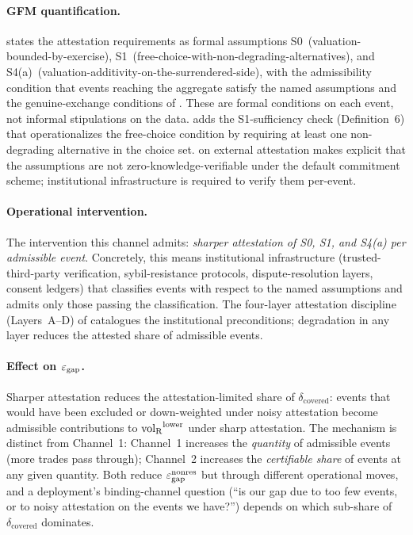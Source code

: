 \paragraph{GFM quantification.}
\citep[Revealed~Sacrifice]{lasser2026paper8a} states the
attestation requirements as formal assumptions
S0~(valuation-bounded-by-exercise),
S1~(free-choice-with-non-degrading-alternatives), and
S4(a)~(valuation-additivity-on-the-surrendered-side), with the
admissibility condition that events reaching the aggregate satisfy
the named assumptions and the genuine-exchange conditions of
\citep[Definition~2]{lasser2026paper8a}.  These are formal
conditions on each event, not informal stipulations on the data.
\citep[Need~Sufficiency]{lasser2026paper8b} adds the
S1-sufficiency check (Definition~6) that operationalizes the
free-choice condition by requiring at least one non-degrading
alternative in the choice set.  \citep[Remark~18]{lasser2026paper8a}
on external attestation makes explicit that the assumptions are
not zero-knowledge-verifiable under the default commitment
scheme; institutional infrastructure is required to verify them
per-event.

\paragraph{Operational intervention.}
The intervention this channel admits: \emph{sharper attestation of
S0, S1, and S4(a) per admissible event}.  Concretely, this means
institutional infrastructure (trusted-third-party verification,
sybil-resistance protocols, dispute-resolution layers, consent
ledgers) that classifies events with respect to the named
assumptions and admits only those passing the classification.
The four-layer attestation discipline (Layers~A--D) of
\citep[Remark~18]{lasser2026paper8a} catalogues the institutional
preconditions; degradation in any layer reduces the attested
share of admissible events.

\paragraph{Effect on $\varepsilon_{\mathrm{gap}}$.}
Sharper attestation reduces the attestation-limited share of
$\delta_{\mathrm{covered}}$: events that would have been excluded
or down-weighted under noisy attestation become admissible
contributions to ${\operatorname{vol}_{\mathrm{R}}}^{\mathrm{lower}}$ under sharp attestation.  The
mechanism is distinct from Channel~1: Channel~1 increases the
\emph{quantity} of admissible events (more trades pass through);
Channel~2 increases the \emph{certifiable share} of events at any
given quantity.  Both reduce $\varepsilon_{\mathrm{gap}}^{\mathrm{nonres}}$ but through different
operational moves, and a deployment's binding-channel question
(``is our gap due to too few events, or to noisy attestation on
the events we have?'') depends on which sub-share of
$\delta_{\mathrm{covered}}$ dominates.

